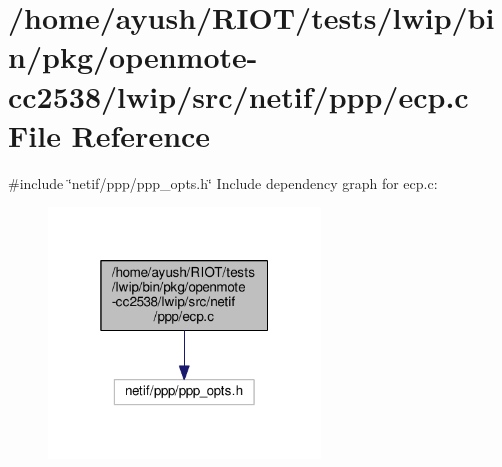 \hypertarget{openmote-cc2538_2lwip_2src_2netif_2ppp_2ecp_8c}{}\section{/home/ayush/\+R\+I\+O\+T/tests/lwip/bin/pkg/openmote-\/cc2538/lwip/src/netif/ppp/ecp.c File Reference}
\label{openmote-cc2538_2lwip_2src_2netif_2ppp_2ecp_8c}
{\ttfamily \#include \char`\"{}netif/ppp/ppp\+\_\+opts.\+h\char`\"{}}\newline
Include dependency graph for ecp.\+c\+:
\nopagebreak
\begin{figure}[H]
\begin{center}
\leavevmode
\includegraphics[width=205pt]{openmote-cc2538_2lwip_2src_2netif_2ppp_2ecp_8c__incl}
\end{center}
\end{figure}
